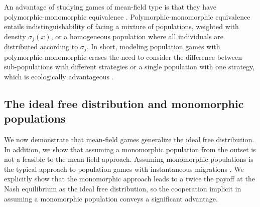 An advantage of studying games of mean-field type is that they have polymorphic-monomorphic equivalence \citep{broom2014asymmetric}. Polymorphic-monomorphic equivalence entails indistinguishability of facing a mixture of populations, weighted with density $\sigma_j(x)$, or a homogeneous population where all individuals are distributed according to $\sigma_j$. In short, modeling population games with polymorphic-monomorphic erases the need to consider the difference between sub-populations with different strategies or a single population with one strategy, which is ecologically advantageous \citep{broom2013game}.


\subsection{The ideal free distribution and monomorphic populations}
We now demonstrate that mean-field games generalize the ideal free distribution. In addition, we show that assuming a monomorphic population from the outset is not a feasible to the mean-field approach. Assuming monomorphic populations is the typical approach to population games with instantaneous migrations  \citep{kvrivan2013behavioral, vincent2005evolutionary}. We explicitly show that the monomorphic approach leads to a twice the payoff at the Nash equilibrium as the ideal free distribution, so the cooperation implicit in assuming a monomorphic population conveys a significant advantage.




